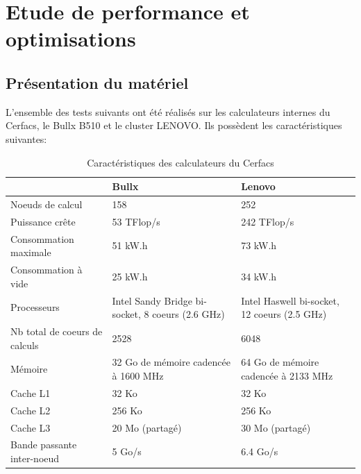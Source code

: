\section{Etude de performance et optimisations}\label{sec:part3}
\subsection{Présentation du matériel}\label{sec:matos}
L'ensemble des tests suivants ont été réalisés sur les calculateurs internes du Cerfacs, le Bullx B510 et le cluster LENOVO. Ils possèdent les caractéristiques suivantes:

\begin{table}[!ht]
  \begin{center}
    \begin{tabular}{|M{3.5cm}|M{5cm}|M{5cm}|}
      \hline
      & Bullx & Lenovo \\
      \hline
      Noeuds de calcul & 158 & 252 \\
      \hline
      Puissance crête & 53 TFlop/s & 242 TFlop/s \\
      \hline
      Consommation maximale & 51 kW.h & 73 kW.h \\
      \hline
      Consommation à vide & 25 kW.h & 34 kW.h \\
      \hline
      Processeurs & Intel Sandy Bridge bi-socket, 8 coeurs (2.6 GHz) & Intel Haswell bi-socket, 12 coeurs (2.5 GHz) \\
      \hline
      Nb total de coeurs de calculs & 2528 & 6048 \\
      \hline
      Mémoire & 32 Go de mémoire cadencée à 1600 MHz & 64 Go de mémoire cadencée à 2133 MHz \\
      \hline
      Cache L1 & 32 Ko & 32 Ko \\
      \hline
      Cache L2 & 256 Ko & 256 Ko \\
      \hline
      Cache L3 & 20 Mo (partagé) & 30 Mo (partagé) \\
      \hline
      Bande passante inter-noeud & 5 Go/s & 6.4 Go/s \\
      \hline
    \end{tabular}
  \end{center}
  \caption{\label{tab:carac}Caractéristiques des calculateurs du Cerfacs}
\end{table}

